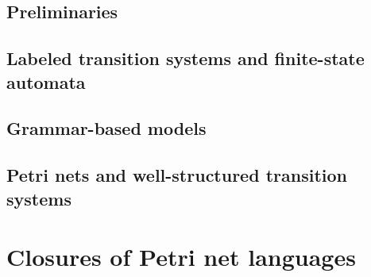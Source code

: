 \documentclass%
[%
    a4paper,                 %
    11pt,                    %
    parskip=half-,           %
    numbers=noenddot,        %
    twoside,                 %
    fleqn,                   %
    toc=chapterentrywithdots,%
    cleardoublepage=plain,   %
]
{style/smbook}
\begin{document}
    

    \chapter{Preliminaries}%
    \label{Chapter:Prelims}%
    \chaptertoc%
        
        
        \clearpage
        
        \clearpage
        
        \clearpage
        

    \chapter{Labeled transition systems and finite-state automata}%
    \label{Chapter:LTSNFAs}%
    \chaptertoc%
        
        
        \clearpage
        
        \clearpage
        
        \clearpage
        
        \clearpage
        

    \chapter{Grammar-based models}%
    \label{Chapter:Grammars}%
    \chaptertoc%
        
        
        \clearpage
        
        \clearpage
        

   \chapter{Petri nets and well-structured transition systems}%
   \label{Chapter:PetriNets}%
   \chaptertoc%
       
       
       \clearpage
       
       \clearpage
       
       \clearpage
       
       \clearpage
       


\part{Closures of Petri net languages}%
\label{Part:Closures}%
\end{document}
